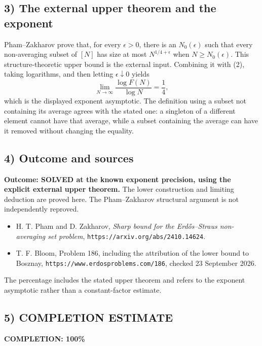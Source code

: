\subsection{3) The external upper theorem and the exponent}
Pham--Zakharov prove that, for every $\epsilon>0$, there is an
$N_0(\epsilon)$ such that every non-averaging subset of $[N]$ has size
at most $N^{1/4+\epsilon}$ when $N\geq N_0(\epsilon)$.
This structure-theoretic upper bound is the external input.
Combining it with (2), taking logarithms, and then letting
$\epsilon\downarrow0$ yields
\[
 \lim_{N\to\infty}\frac{\log F(N)}{\log N}=\frac14,
\]
which is the displayed exponent asymptotic. The definition using a
subset not containing its average agrees with the stated one: a singleton
of a different element cannot have that average, while a subset containing
the average can have it removed without changing the equality.

\subsection{4) Outcome and sources}
\textbf{Outcome: SOLVED at the known exponent precision, using the
explicit external upper theorem.} The lower construction and limiting
deduction are proved here. The Pham--Zakharov structural argument is
not independently reproved.
\begin{itemize}
\item H. T. Pham and D. Zakharov, \emph{Sharp bound for the
Erd\H{o}s--Straus non-averaging set problem},
\texttt{https://arxiv.org/abs/2410.14624}.
\item T. F. Bloom, Problem 186, including the attribution of the
lower bound to Bosznay,
\texttt{https://www.erdosproblems.com/186}, checked 23 September 2026.
\end{itemize}
The percentage includes the stated upper theorem and refers to the
exponent asymptotic rather than a constant-factor estimate.
\subsection{5) COMPLETION ESTIMATE}
\textbf{COMPLETION: 100\%}
